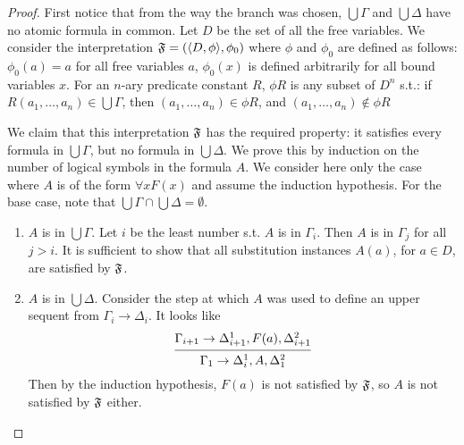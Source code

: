 \documentclass[11pt]{article}
\begin{document}
\begin{proof}
First notice that from the way the branch was chosen, \(\bigcup\Gamma\) and \(\bigcup\Delta\)
have no atomic formula in common. Let \(D\) be the set of all the free variables. We consider the
interpretation \(\mathfrak{F}=(\langle D,\phi\rangle,\phi_0)\) where \(\phi\) and \(\phi_0\) are defined as follows:
\(\phi_0(a)=a\) for all free variables \(a\), \(\phi_0(x)\) is defined arbitrarily for all bound
variables \(x\). For an \(n\)-ary predicate constant \(R\), \(\phi R\) is any subset of \(D^n\)
s.t.:
if \(R(a_1,\dots,a_n)\in\bigcup\Gamma\), then \((a_1,\dots,a_n)\in\phi R\), and
\((a_1,\dots,a_n)\not\in\phi R\)

We claim that this interpretation \(\mathfrak{F}\) has the required property: it satisfies every formula
in \(\bigcup\Gamma\), but no formula in \(\bigcup\Delta\). We prove this by induction on the
number of logical symbols in the formula \(A\). We consider here only the case where \(A\) is of
the form \(\forall xF(x)\) and assume the induction hypothesis. For the base case, note that \(\bigcup\Gamma\cap\bigcup\Delta=\emptyset\).

\begin{enumerate}
\item \(A\) is in \(\bigcup\Gamma\). Let \(i\) be the least number s.t. \(A\) is in \(\Gamma_i\).
Then \(A\) is in \(\Gamma_j\) for all \(j>i\). It is sufficient to show that all substitution
instances \(A(a)\), for \(a\in D\), are satisfied by \(\mathfrak{F}\).
\item \(A\) is in \(\bigcup\Delta\). Consider the step at which \(A\) was used to define an upper
sequent from \(\Gamma_i\to\Delta_i\). It looks like
\begin{equation*}
\begin{prooftree}%
\hypo{\Gamma_{i+1}\to\Delta_{i+1}^1,F(a),\Delta_{i+1}^2}
\infer1{\Gamma_1\to\Delta_i^1,A,\Delta_1^2}
\end{prooftree}
\end{equation*}
Then by the induction hypothesis, \(F(a)\) is not satisfied by \(\mathfrak{F}\), so \(A\) is not
satisfied by \(\mathfrak{F}\) either.
\end{enumerate}
\end{proof}
\end{document}
